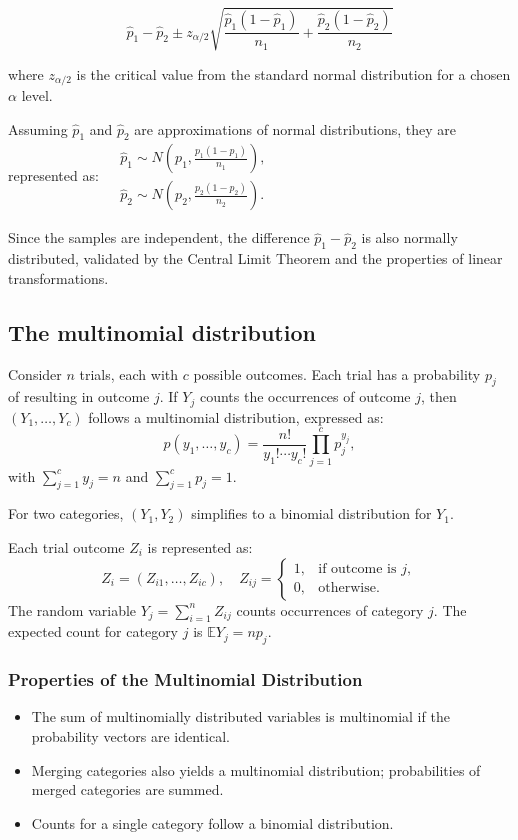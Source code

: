 \documentclass{article}
\begin{document}
$$
\hat{p}_{1} - \hat{p}_{2} \pm z_{\alpha / 2} \sqrt{\frac{\hat{p}_{1} (1 - \hat{p}_{1})}{n_{1}} + \frac{\hat{p}_{2} (1 - \hat{p}_{2})}{n_{2}}}
$$

where $z_{\alpha / 2}$ is the critical value from the standard normal distribution for a chosen $\alpha$ level.

Assuming $\hat{p}_{1}$ and $\hat{p}_{2}$ are approximations of normal distributions, they are represented as:
$\begin{aligned}
& \hat{p}_{1} \sim N\left(p_{1}, \frac{p_{1}(1-p_{1})}{n_{1}}\right), \\
& \hat{p}_{2} \sim N\left(p_{2}, \frac{p_{2}(1-p_{2})}{n_{2}}\right).
\end{aligned}$

Since the samples are independent, the difference $\hat{p}_{1} - \hat{p}_{2}$ is also normally distributed, validated by the Central Limit Theorem and the properties of linear transformations.

\subsection{The multinomial distribution}

Consider $n$ trials, each with $c$ possible outcomes. Each trial has a probability $p_j$ of resulting in outcome $j$. If $Y_j$ counts the occurrences of outcome $j$, then $(Y_1, \ldots, Y_c)$ follows a multinomial distribution, expressed as:
$$
p(y_1, \ldots, y_c) = \frac{n!}{y_1! \cdots y_c!} \prod_{j=1}^{c} p_j^{y_j},
$$
with $\sum_{j=1}^{c} y_j = n$ and $\sum_{j=1}^{c} p_j = 1$.

For two categories, $(Y_1, Y_2)$ simplifies to a binomial distribution for $Y_1$.

Each trial outcome $Z_i$ is represented as:
$$
Z_i = (Z_{i1}, \ldots, Z_{ic}), \quad Z_{ij} = \begin{cases} 1, & \text{if outcome is } j, \\ 0, & \text{otherwise.} \end{cases}
$$
The random variable $Y_j = \sum_{i=1}^{n} Z_{ij}$ counts occurrences of category $j$. The expected count for category $j$ is $\mathbb{E}Y_j = n p_j$.

\subsubsection{Properties of the Multinomial Distribution}

\begin{itemize}
    \item The sum of multinomially distributed variables is multinomial if the probability vectors are identical.
    \item Merging categories also yields a multinomial distribution; probabilities of merged categories are summed.
    \item Counts for a single category follow a binomial distribution.
\end{itemize}
\end{document}
